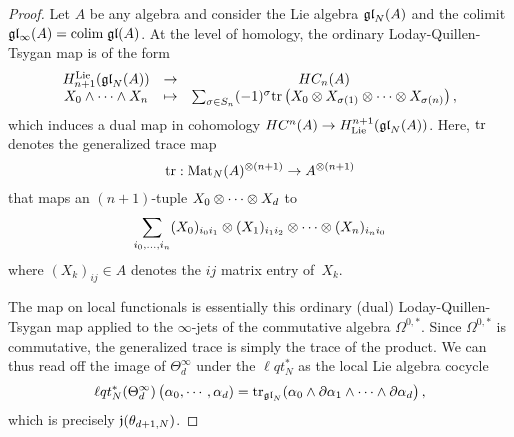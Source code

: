 \begin{proof}
Let $A$ be any algebra and consider the Lie algebra ${\mathfrak{gl}}_N(A)$ and the colimit $\mathfrak{g} \mathfrak{l}_\infty(A) = {\rm colim} \; {\mathfrak{gl}} (A)$. 
At the level of homology, the ordinary Loday-Quillen-Tsygan map is of the form
\[
\begin{array}{ccc}
H_{n+1}^{\rm Lie}({\mathfrak{gl}}_N(A)) & \to & HC_{n}(A) \\
X_0 \wedge \cdots \wedge X_n & \mapsto & \sum_{\sigma \in S_n} (-1)^{\sigma} {\rm tr} \left(X_0 \otimes X_{\sigma(1)} \otimes\cdots \otimes X_{\sigma(n)} \right), 
\end{array}
\] 
which induces a dual map in cohomology $HC^n(A) \to H^{n+1}_{\rm Lie}({\mathfrak{gl}}_N(A))$. 
Here, ${\rm tr}$ denotes the generalized trace map
\[
{\rm tr} : {\rm Mat}_N(A)^{\otimes(n+1)} \to A^{\otimes (n+1)} 
\]
that maps an $(n+1)$-tuple $X_0\otimes \cdots \otimes X_d$ to 
\[
\sum_{i_0,\ldots,i_n} (X_0)_{i_0 i_1} \otimes (X_1)_{i_1i_2} \otimes \cdots \otimes (X_n)_{i_n i_0}
\]
where $(X_k)_{ij} \in A$ denotes the $ij$ matrix entry of~$X_k$.

The map on local functionals is essentially this ordinary (dual) Loday-Quillen-Tsygan map applied to the $\infty$-jets of the commutative algebra $\Omega^{0,*}$. 
Since $\Omega^{0,*}$ is commutative, the generalized trace is simply the trace of the product.
We can thus read off the image of $\Theta^\infty_d$ under the $\ell q t_N^*$ as the local Lie algebra cocycle
\begin{align*}
\ell q t_N^*(\Theta_d^\infty)\left(\alpha_0, \cdots, \alpha_d) = {\rm tr}_{{\mathfrak{gl}}_N}(\alpha_0 \wedge \partial \alpha_1\wedge \cdots \wedge \partial \alpha_d\right),
\end{align*}
which is precisely $\mathfrak j(\theta_{d+1,N})$. 
\end{proof}


